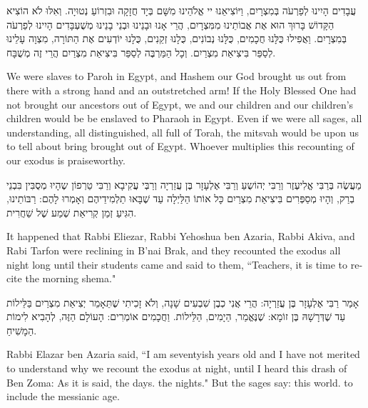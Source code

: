 עֲבָדִים הָיִינוּ לְפַרְעֹה בְּמִצְרָיִם, וַיּוֹצִיאֵנוּ יי אֱלֹהֵינוּ מִשָּׁם בְּיָד חֲזָקָה וּבִזְרוֹעַ נְטוּיָה. וְאִלּוּ לֹא הוֹצִיא הַקָּדוֹשׁ בָּרוּךְ הוּא אֶת אֲבוֹתֵינוּ מִמִּצְרָיִם, הֲרֵי אָנוּ וּבָנֵינוּ וּבְנֵי בָנֵינוּ מְשֻׁעְבָּדִים הָיִינוּ לְפַרְעֹה בְּמִצְרָיִם. וַאֲפִילוּ כֻּלָּנוּ חֲכָמִים, כֻּלָּנוּ נְבוֹנִים, כֻּלָנוּ זְקֵנִים, כֻּלָנוּ יוֹדְעִים אֶת הַתּוֹרָה, מִצְוָה עָלֵינוּ לְסַפֵּר בִּיצִיאַת מִצְרַיִם. וְכָל הַמַּרְבֶּה לְסַפֵּר בִּיצִיאַת מִצְרַיִם הֲרֵי זֶה מְשֻׁבָּח.

\begin{english}
We were slaves to Paroh in Egypt, and Hashem our God brought us out from there with a strong hand and an outstretched arm! If the Holy Blessed One had not brought our ancestors out of Egypt, we and our children and our children's children would be be enslaved to Pharaoh in Egypt. Even if we were all sages, all understanding, all distinguished, all full of Torah, the mitsvah would be upon us to tell about bring brought out of Egypt. Whoever multiplies this recounting of our exodus is praiseworthy.
\end{english}

מַעֲשֶׂה בְּרַבִּי אֱלִיעֶזֶר וְרַבִּי יְהוֹשֻעַ וְרַבִּי אֶלְעָזָר בֶּן עֲזַרְיָה וְרַבְּי עֲקִיבָא וְרַבִּי טַרְפוֹן שֶהָיוּ מְסֻבִּין בִּבְנֵי בְרַק, וְהָיוּ מְסַפְּרִים בִּיצִיאַת מִצְרַיִם כָּל אוֹתוֹ הַלַּיְלָה עַד שֶׁבָּאוּ תַלְמִידֵיהֶם וְאָמְרוּ לָהֶם: רַבּוֹתֵינוּ, הִגִּיעַ זְמַן קְרִיאַת שְׁמַע שֶׁל שַׁחֲרִית.

\begin{english}
It happened that Rabbi Eliezar, Rabbi Yehoshua ben Azaria, Rabbi Akiva, and Rabi Tarfon were reclining in B'nai Brak, and they recounted the exodus all night long until their students came and said to them, ``Teachers, it is time to recite the morning shema."
\end{english}

\break

אָמַר רַבִּי אֶלְעָזָר בֶּן עֲזַרְיָה: הֲרֵי אֲנִי כְבֶן שִׁבְעִים שָׁנָה, וְלֹא זָכִיתִי שֶׁתֵּאָמֵר יְצִיאַת מִצְרַיִם בַּלֵּילוֹת עַד שֶׁדְּרָשָׁהּ בֶּן זוֹמָא: שֶׁנֶּאֱמַר,
הַיָמִים,
הַלֵּילוֹת. וַחֲכָמִים אוֹמְרִים: 
הָעוֹלָם הַזֶּה, 
לְהָבִיא לִימוֹת הַמָשִׁיחַ.

\begin{english}
Rabbi Elazar ben Azaria said, ``I am seventyish years old and I have not merited to understand why we recount the exodus at night, until I heard this drash of Ben Zoma: As it is said,   the days.  the nights." But the sages say:  this world.  to include the messianic age.
\end{english}

